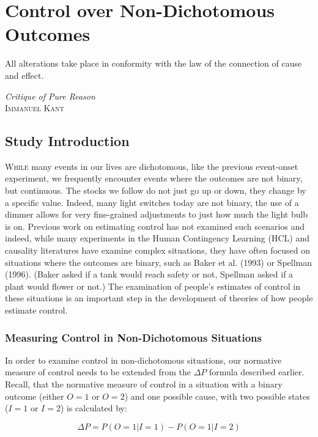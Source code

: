 \documentclass[USenglish,letterpaper,12pt,extrafontsizes,oneside,onecolumn,final]{memoir}
\newcommand{\deltap}{$\Delta P$}
\begin{document}
\chapter{Control over Non-Dichotomous Outcomes}
\label{chap:widgets}

\epigraph{\SingleSpacing All alterations take place in conformity with the law of the connection of cause and effect.}{\textit{Critique of Pure Reason}\\ \textsc{Immanuel Kant}}

\section{Study Introduction}
\lettrine[lines=2,slope=-3pt,nindent=2pt]{W}{hile} many events in our lives are dichotomous, like the previous event-onset experiment, we frequently encounter events where the outcomes are not binary, but continuous.  The stocks we follow do not just go up or down, they change by a specific value.  Indeed, many light switches today are not binary, the use of a dimmer allows for very fine-grained adjustments to just how much the light
bulb is on. Previous work on estimating control has not examined such scenarios and indeed, while many experiments in the Human Contingency Learning (HCL) and causality literatures have examine complex situations, they have often focused on situations where the outcomes are binary, such as Baker et al. (1993) or Spellman (1996).  (Baker asked if a tank would reach safety or not, Spellman asked if a plant would flower or not.)
The examination of people's estimates of control in these situations is an important step in the development of theories of how people estimate control.

\subsection{Measuring Control in Non-Dichotomous Situations}

In order to examine control in non-dichotomous situations, our normative measure of control needs to be
extended from the \deltap \xspace formula described earlier.  Recall, that the normative
measure of control in a situation with a binary outcome (either $O=1$ or $O=2$) and one
possible cause, with two possible states ($I=1$ or $I=2$) is calculated by: 

\begin{displaymath}
\Delta P = P(O=1|I=1) - P(O=1|I=2)
\end{displaymath}
\end{document}
